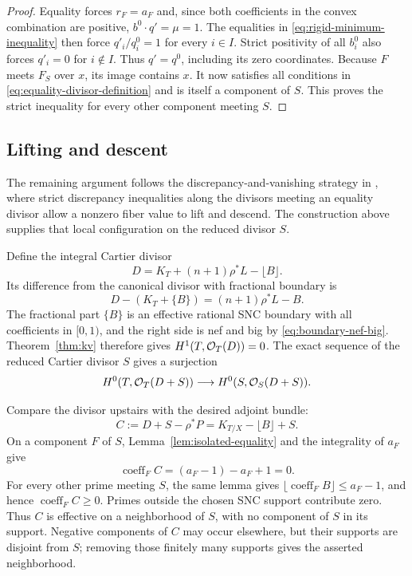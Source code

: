 \begin{proof}
Equality forces \(r_F=a_F\) and, since both coefficients in the
convex combination are positive, \(b^0\cdot q'=\mu=1\).
The equalities in \eqref{eq:rigid-minimum-inequality} then force
\(q'_i/q_i^0=1\) for every \(i\in I\).  Strict positivity of all
\(b_i^0\) also forces \(q'_i=0\) for \(i\notin I\).  Thus
\(q'=q^0\), including its zero coordinates.  Because \(F\) meets
\(F_S\) over \(x\), its image contains \(x\).  It now satisfies
all conditions in \eqref{eq:equality-divisor-definition} and is
itself a component of \(S\).  This proves the strict inequality for
every other component meeting \(S\).
\end{proof}

\subsection{Lifting and descent}\label{sec:final-lift}

The remaining argument follows the discrepancy-and-vanishing strategy
in \cite[\S1(1.6)]{fujita1993}, where strict discrepancy inequalities
along the divisors meeting an equality divisor allow a nonzero fiber
value to lift and descend. The construction above supplies that local
configuration on the reduced divisor $S$.

Define the integral Cartier divisor
\begin{equation}
 D=K_T+(n+1)\rho^*L-\lfloor B\rfloor.
 \label{eq:final-lifting-divisor}
\end{equation}
Its difference from the canonical divisor with fractional boundary is
\[
 D-(K_T+\{B\})=(n+1)\rho^*L-B.
\]
The fractional part \(\{B\}\) is an effective rational SNC boundary
with all coefficients in \([0,1)\), and the right side is nef and big
by \eqref{eq:boundary-nef-big}.  Theorem~\ref{thm:kv} therefore gives
\(H^1(T,\mathcal O_T(D))=0\).  The exact sequence of the reduced Cartier
divisor \(S\) gives a surjection
\begin{equation}
 H^0(T,\mathcal O_T(D+S))
       \longrightarrow H^0(S,\mathcal O_S(D+S)).
 \label{eq:final-restriction-surjection}
\end{equation}

Compare the divisor upstairs with the desired adjoint bundle:
\begin{equation}
 C:=D+S-\rho^*P=K_{T/X}-\lfloor B\rfloor+S.
 \label{eq:final-correction}
\end{equation}
On a component \(F\) of \(S\), Lemma~\ref{lem:isolated-equality}
and the integrality of \(a_F\) give
\[
 \operatorname{coeff}_F C=(a_F-1)-a_F+1=0.
\]
For every other prime meeting \(S\), the same lemma gives
\(\lfloor\operatorname{coeff}_F B\rfloor\leq a_F-1\), and hence
\(\operatorname{coeff}_F C\geq0\).  Primes outside the chosen SNC
support contribute zero.  Thus \(C\) is effective on a neighborhood
of \(S\), with no component of \(S\) in its support.  Negative
components of \(C\) may occur elsewhere, but their supports are
disjoint from \(S\); removing those finitely many supports gives the
asserted neighborhood.

